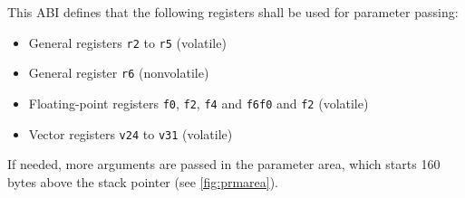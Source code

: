 \documentclass[english,11pt,twoside,toc=bib,toc=idx]{scrreprt}
\newcommand{\STACKSIZE}{160}
\newcommand{\STACKSIZE}{96}
\begin{document}
This ABI defines that the following registers shall be used for parameter
passing:
\begin{itemize}
\item General registers \texttt{r2} to \texttt{r5} (volatile)
\item General register \texttt{r6} (nonvolatile)
\item Floating-point registers {\ifzseries\texttt{f0}, \texttt{f2},
    \texttt{f4} and \texttt{f6}\else \texttt{f0} and \texttt{f2}\fi}
  (volatile)
\item Vector registers \texttt{v24} to \texttt{v31} (volatile)
\end{itemize}

If needed, more arguments are passed in the parameter area, which starts
\STACKSIZE{} bytes above the stack pointer (see \cref{fig:prmarea}).
\end{document}
